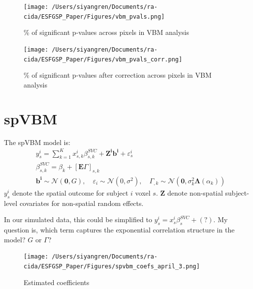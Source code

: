 \documentclass[12pt]{article}
\begin{document}
\begin{figure}[H]
    \centering
    \begin{minipage}[b]{0.45\textwidth}
        \texttt{[image: /Users/siyangren/Documents/ra-cida/ESFGSP\_Paper/Figures/vbm\_pvals.png]}
        \caption{\% of significant p-values across pixels in VBM analysis}
    \end{minipage}
    \hfill %
    \begin{minipage}[b]{0.45\textwidth}
        \texttt{[image: /Users/siyangren/Documents/ra-cida/ESFGSP\_Paper/Figures/vbm\_pvals\_corr.png]}
        \caption{\% of significant p-values after correction across pixels in VBM analysis}
    \end{minipage}
\end{figure}


\section*{spVBM}

The spVBM model is:
\[
    \begin{aligned}
         & y_s^i=\sum_{k=1}^K x_{s, k}^i \beta_{s, k}^{S V C}+\mathbf{Z}^{\mathbf{i}} \mathbf{b}^{\mathbf{i}}+\varepsilon_s^i                                                                                                                      \\
         & \beta_{s, k}^{S V C}=\beta_k+[\mathbf{E} \Gamma]_{s, k}                                                                                                                                                                                 \\
         & \mathbf{b}^{\mathbf{i}} \sim \mathcal{N}(\mathbf{0}, G), \quad \varepsilon_i \sim \mathcal{N}\left(0, \sigma^2\right), \quad \Gamma_{, k} \sim \mathcal{N}\left(\mathbf{0}, \sigma_k^2 \boldsymbol{\Lambda}\left(\alpha_k\right)\right)
    \end{aligned}
\]
\(y_s^i\) denote the spatial outcome for subject \(i\) voxel \(s\). \(\mathbf{Z}\) denote non-spatial subject-level covariates for non-spatial random effects.

In our simulated data, this could be simplified to \(y_s^i = x_s^i \beta_s^{SVC} + (?) \). My question is, which term captures the exponential correlation structure in the model? \(G\) or \(\Gamma\)?

\begin{figure}[H]
    \centering
    \texttt{[image: /Users/siyangren/Documents/ra-cida/ESFGSP\_Paper/Figures/spvbm\_coefs\_april\_3.png]}
    \caption{Estimated coefficients}
    \label{fig:my_label}
\end{figure}
\end{document}
